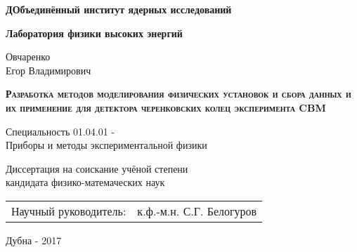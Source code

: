 \begin{titlepage}

\centering

\textbf{
ДОбъединённый институт ядерных исследований
}


\textbf{
Лаборатория физики высоких энергий
}

\vspace{1cm}

Овчаренко \\
Егор Владимирович

\vspace{2cm}

\textbf{
\textsc{
Разработка методов моделирования физических установок и сбора данных и их применение для детектора черенковских колец эксперимента CBM
}
}

\vspace{2cm}

Специальность 01.04.01 - \\
Приборы и методы экспериментальной физики

\vspace{2cm}

Диссертация на соискание учёной степени \\
кандидата физико-матемаческих наук

\vspace{2cm}

\begin{tabu} to \textwidth { X[l] X[r] }
	{Научный руководитель:} & {к.ф.-м.н. С.Г. Белогуров} \\
\end{tabu}

\vspace{2cm}

Дубна - 2017

\end{titlepage}
